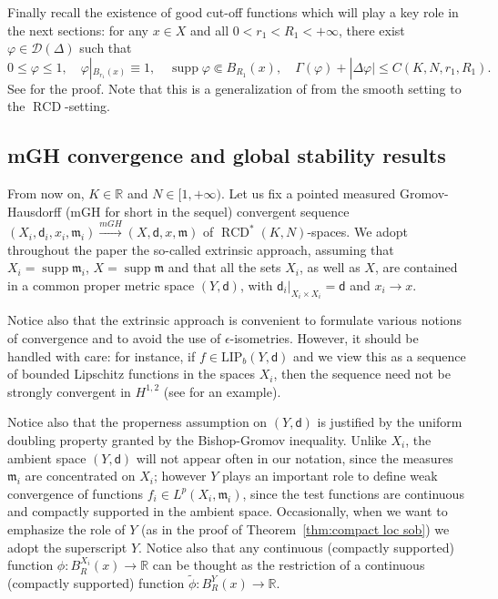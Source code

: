 \documentclass[a4paper,11pt,reqno]{article}
\numberwithin{equation}{section}
\theoremstyle{plain}
\theoremstyle{definition}
\theoremstyle{remark}
\let\altphi\phi
\let\phi\varphi
\let\varphi\altphi
\let\altphi\undefined
\DeclareMathOperator{\supp}{supp}
\newcommand{\dist}{\mathsf{d}}
\newcommand{\meas}{\mathfrak{m}}
\DeclareMathOperator{\RCD}{RCD}
\begin{document}
Finally recall the existence of good cut-off functions which will play a key role in the next sections: 
for any $x \in X$ and all $0<r_1<R_1<+\infty$,  there exist $\phi \in\mathcal{D}(\Delta)$ such that
\begin{equation}\label{eq:good cf}
 0 \le \phi \le 1, \quad\phi|_{B_{r_1}(x)}\equiv 1, \quad\supp \phi \Subset B_{R_1}(x), \quad \Gamma (\phi ) + |\Delta \phi| \le C(K, N, r_1, R_1).
\end{equation}
See \cite[Lemma 3.1]{MondinoNaber} for the proof.
Note that this is a generalization of \cite[Theorem 6.33]{CheegerColding} from the smooth setting to the $\RCD$-setting.


\subsection{mGH convergence and global stability results}

From now on, $K\in\mathbb{R}$ and $N \in [1,+\infty)$. Let us fix a pointed measured Gromov-Hausdorff (mGH for short in the sequel) convergent sequence $(X_i, \dist_i, x_i, \meas_i) \stackrel{mGH}{\to} (X, \dist, x, \meas)$ of $\RCD^*(K, N)$-spaces. We adopt throughout the
paper the so-called
extrinsic approach, assuming that $X_i=\supp\meas_i$, $X=\supp\meas$ and that all the sets $X_i$, as well as $X$, are contained in a common
proper metric space $(Y,\dist)$, with $\dist_i\vert_{X_i\times X_i}=\dist$ and $x_i\to x$. 

Notice also that
the extrinsic approach is convenient to formulate various notions of convergence and to avoid the use of
$\epsilon$-isometries. However, it should be handled with care: for instance, if $f\in\mathrm{LIP}_b(Y,\dist)$ and we view
this as a sequence of bounded Lipschitz functions in the spaces $X_i$, then the sequence need not be strongly
convergent in $H^{1,2}$ (see \cite{AmbrosioStraTrevisan} for an example).

Notice also that the properness assumption on
$(Y,\dist)$ is justified by the uniform doubling property granted by the Bishop-Gromov inequality. Unlike $X_i$, the ambient space
$(Y,\dist)$ will not appear often in our notation, since the measures $\meas_i$ are concentrated on $X_i$; however $Y$
plays an important role to define weak convergence of functions $f_i\in L^p(X_i,\meas_i)$, since the test functions 
are continuous and compactly supported in the ambient space. Occasionally, when we want to emphasize the role of $Y$ (as in
the proof of Theorem~\ref{thm:compact loc sob}) we adopt the superscript $Y$. Notice also that any continuous (compactly
supported) function $\varphi:B_R^{X_i}(x)\to\mathbb R$ can be thought as the restriction of a continuous (compactly supported)
function $\tilde\varphi:B_R^Y(x)\to\mathbb R$.
\end{document}
